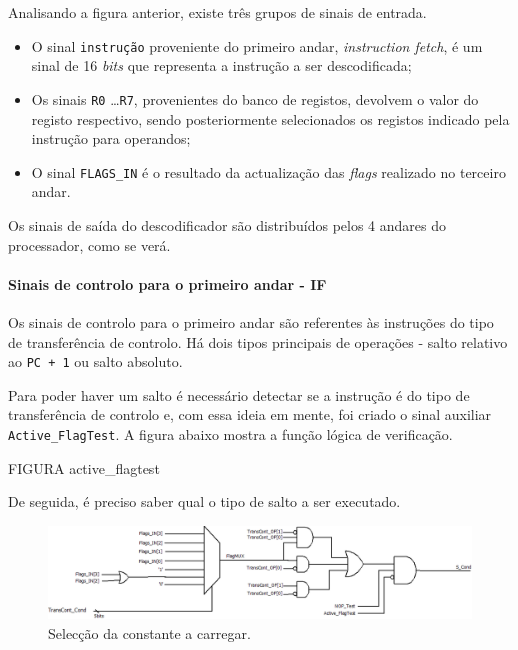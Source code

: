 \documentclass[11pt]{article}
\numberwithin{equation}{section}
\begin{document}
Analisando a figura anterior, existe três grupos de sinais de entrada.

\vspace{-2mm}

\begin{itemize}
	\item  O sinal \texttt{instrução} proveniente do primeiro andar, \textit{instruction fetch}, é um sinal de 16 \textit{bits} que representa a instrução a ser descodificada;
	\vspace{-2.5mm}
	\item Os sinais \texttt{R0} \ldots \texttt{R7}, provenientes do banco de registos, devolvem o valor do registo respectivo, sendo posteriormente selecionados os registos indicado pela instrução para operandos;
	\vspace{-2.5mm}
	\item  O sinal \texttt{FLAGS\_IN} é o resultado da actualização das \textit{flags} realizado no terceiro andar.
\end{itemize}

Os sinais de saída do descodificador são distribuídos pelos 4 andares do processador, como se verá.
	
\paragraph{Sinais de controlo para o primeiro andar - IF} 

Os sinais de controlo para o primeiro andar são referentes às instruções do tipo de transferência de controlo. Há dois tipos principais de operações - salto relativo ao \texttt{PC + 1} ou salto absoluto. 

Para poder haver um salto é necessário detectar se a instrução é do tipo de transferência de controlo e, com essa ideia em mente, foi criado o sinal auxiliar \texttt{Active\_FlagTest}. A figura abaixo mostra a função lógica de verificação. 

FIGURA active\_flagtest

De seguida, é preciso saber qual o tipo de salto a ser executado. 

\vspace{2mm}

\begin{figure}[H]
	\centering
	\includegraphics[keepaspectratio=true, scale=0.40]{imagens/Flagteste}
	\caption{Selecção da constante a carregar.}
	\vspace{-0.8em}
\end{figure}
\end{document}
